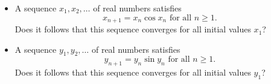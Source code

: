 \begin{itemize}
\item[(a)] A sequence \(x_1,x_2,\dots\) of real numbers satisfies
\[x_{n+1}=x_n \cos x_n \textrm{ for all } n\geq 1.\]
Does it follows that this sequence converges for all initial values \(x_1\)?

\item[(b)] A sequence \(y_1,y_2,\dots\) of real numbers satisfies
\[y_{n+1}=y_n \sin y_n \textrm{ for all } n\geq 1.\]
Does it follows that this sequence converges for all initial values \(y_1\)?
\end{itemize}